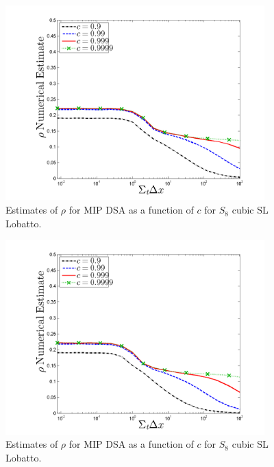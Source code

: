 \begin{figure}[!hbp]
\centering
\includegraphics[width=10cm]{chapter4_acceleration/Constant_XS_c_comparions_S2SA_Gauss.png}
\caption{Estimates of $\rho$ for MIP DSA as a function of $c$  for  $S_8$  cubic SL Lobatto.}
\label{fig:s2sa_gauss_as_fun_c}
\end{figure}

%
%
\begin{figure}[!htp]
\centering
\includegraphics[width=10cm]{chapter4_acceleration/Constant_XS_c_comparions_S2SA_Lobatto.png}
\caption{Estimates of $\rho$ for MIP DSA as a function of $c$  for  $S_8$  cubic SL Lobatto.}
\label{fig:s2sa_lobatto_as_fun_c}
\end{figure}

